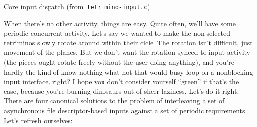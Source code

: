 \begin{listing}[!htbp]
\inputminted[]{C}{code/tetrimino-inputcore.h}
\caption{Core input dispatch (from~\texttt{tetrimino-input.c}).}
\label{list:tetrimino-inputcore}
\end{listing}

When there's no other activity, things are easy. Quite often, we'll
have some periodic concurrent activity. Let's say we wanted to make the non-selected
tetriminos slowly rotate around within their cicle. The rotation isn't
difficult, just movement of the planes. But we don't want the rotation synced
to input activity (the pieces ought rotate freely without the user doing
anything), and you're hardly the kind of know-nothing what-not that
would busy loop on a nonblocking input interface, right? I hope you don't
consider yourself ``green'' if that's the case, because you're burning
dinosaurs out of sheer laziness. Let's do it right. There are four
canonical solutions to the problem of interleaving a set of asynchronous file
descriptor-based inputs against a set of periodic requirements. Let's refresh
ourselves:

